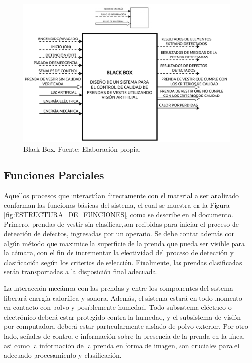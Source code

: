 \begin{figure}[H]
    \centering
    \includegraphics[width=\textwidth]{img/BLACK_BOX.drawio.pdf}
    \caption[Black Box.]{Black Box. Fuente: Elaboración propia.}
    \label{fig:BLACK_BOX}
\end{figure}

\subsection{Funciones Parciales}

Aquellos procesos que interactúan directamente con el material a ser analizado conforman las funciones básicas del sistema, el cual se muestra en la Figura \ref{fig:ESTRUCTURA_DE_FUNCIONES}, como se describe en el documento. Primero, prendas de vestir sin clasificar,son recibidas para iniciar el proceso de detección de defectos, ingresadas por un operario. Se debe contar además con algún método que maximice la superficie de la prenda que pueda ser visible para la cámara, con el fin de incrementar la efectividad del proceso de detección y clasificación según los criterios de selección. Finalmente, las prendas clasificadas serán transportadas a la disposición final adecuada.

La interacción mecánica con las prendas y entre los componentes del sistema liberará energía calorífica y sonora. Además, el sistema estará en todo momento en contacto con polvo y posiblemente humedad. Todo subsistema eléctrico o electrónico deberá estar protegido contra la humedad, y el subsistema de visión por computadora deberá estar particularmente aislado de polvo exterior. Por otro lado, señales de control e información sobre la presencia de la prenda en la línea, así como la información de la prenda en forma de imagen, son cruciales para el adecuado procesamiento y clasificación.

